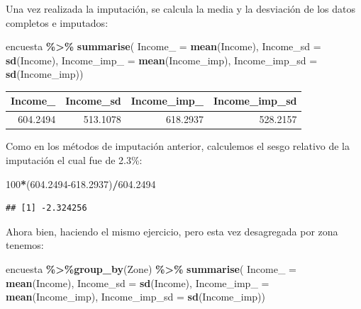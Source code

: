 \documentclass[
  spanish,
  12pt,
]{book}
\newenvironment{Shaded}{\begin{snugshade}}{\end{snugshade}}
\newcommand{\AttributeTok}[1]{\textcolor[rgb]{0.13,0.29,0.53}{#1}}
\newcommand{\DecValTok}[1]{\textcolor[rgb]{0.00,0.00,0.81}{#1}}
\newcommand{\FloatTok}[1]{\textcolor[rgb]{0.00,0.00,0.81}{#1}}
\newcommand{\FunctionTok}[1]{\textcolor[rgb]{0.13,0.29,0.53}{\textbf{#1}}}
\newcommand{\NormalTok}[1]{#1}
\newcommand{\SpecialCharTok}[1]{\textcolor[rgb]{0.81,0.36,0.00}{\textbf{#1}}}
\begin{document}
Una vez realizada la imputación, se calcula la media y la desviación de los datos completos e imputados:

\begin{Shaded}
\begin{Highlighting}[]
\NormalTok{encuesta }\SpecialCharTok{\%\textgreater{}\%} \FunctionTok{summarise}\NormalTok{(}
  \AttributeTok{Income\_ =} \FunctionTok{mean}\NormalTok{(Income),}
  \AttributeTok{Income\_sd =} \FunctionTok{sd}\NormalTok{(Income),}
  \AttributeTok{Income\_imp\_ =} \FunctionTok{mean}\NormalTok{(Income\_imp),}
  \AttributeTok{Income\_imp\_sd =} \FunctionTok{sd}\NormalTok{(Income\_imp))}
\end{Highlighting}
\end{Shaded}

\begin{tabular}{r|r|r|r}
\hline
Income\_ & Income\_sd & Income\_imp\_ & Income\_imp\_sd\\
\hline
604.2494 & 513.1078 & 618.2937 & 528.2157\\
\hline
\end{tabular}

Como en los métodos de imputación anterior, calculemos el sesgo relativo de la imputación el cual fue de 2.3\%:

\begin{Shaded}
\begin{Highlighting}[]
\DecValTok{100}\SpecialCharTok{*}\NormalTok{(}\FloatTok{604.2494{-}618.2937}\NormalTok{)}\SpecialCharTok{/}\FloatTok{604.2494}
\end{Highlighting}
\end{Shaded}

\begin{verbatim}
## [1] -2.324256
\end{verbatim}

Ahora bien, haciendo el mismo ejercicio, pero esta vez desagregada por zona tenemos:

\begin{Shaded}
\begin{Highlighting}[]
\NormalTok{encuesta }\SpecialCharTok{\%\textgreater{}\%}\FunctionTok{group\_by}\NormalTok{(Zone) }\SpecialCharTok{\%\textgreater{}\%}  \FunctionTok{summarise}\NormalTok{(}
  \AttributeTok{Income\_ =} \FunctionTok{mean}\NormalTok{(Income),}
  \AttributeTok{Income\_sd =} \FunctionTok{sd}\NormalTok{(Income),}
  \AttributeTok{Income\_imp\_ =} \FunctionTok{mean}\NormalTok{(Income\_imp),}
  \AttributeTok{Income\_imp\_sd =} \FunctionTok{sd}\NormalTok{(Income\_imp))}
\end{Highlighting}
\end{Shaded}
\end{document}
